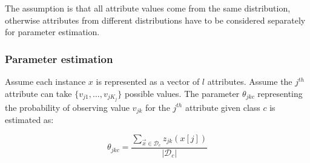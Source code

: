 		The assumption is that all attribute values come from the same distribution, otherwise attributes from different distributions have to be considered separately for parameter estimation.

		\subsubsection{Parameter estimation}
		Assume each instance $x$ is represented as a vector of $l$ attributes.
		Assume the $j^{th}$ attribute can take $\{v_{j1}, \dots, v_{jK_j}\}$ possible values.
		The parameter $\theta_{jkc}$ representing the probability of observing value $v_{jk}$ for the $j^{th}$ attribute given class $c$ is estimated as:

		$$\theta_{jkc} = \frac{\sum\limits_{\vec{x}\in\mathcal{D}_c}z_{jk}(x[j])}{|\mathcal{D}_c|}$$
